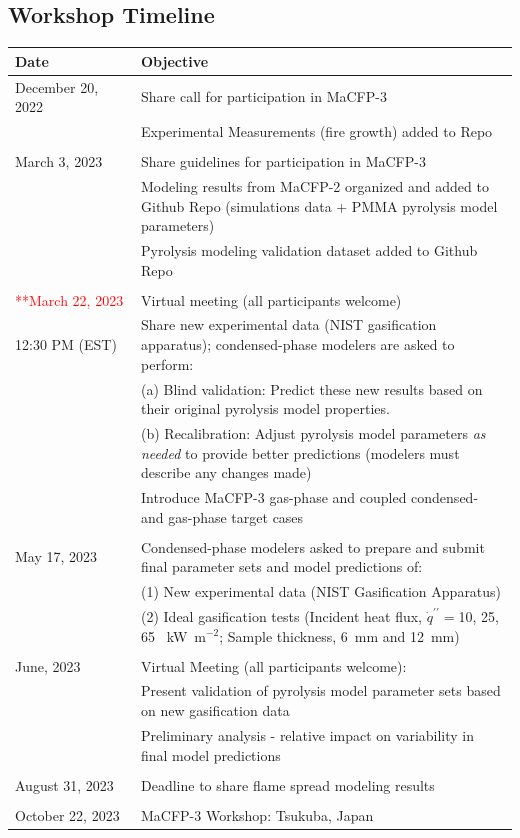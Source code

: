 \documentclass[12pt]{article}
\newcommand{\pp}{\prime\prime}
\begin{document}
\subsection{Workshop Timeline}
\label{Timeline}
\begin{table}[htb]
\begin{tabular}{p{0.25\linewidth} | p{0.75\linewidth}}
\hline
\textbf{Date}       	& \textbf{Objective} \\
\hline
December 20, 2022	& Share call for participation in MaCFP-3\\
& Experimental Measurements (fire growth) added to Repo\\ 
\\
March 3, 2023    	& Share guidelines for participation in MaCFP-3 \\
& Modeling results from MaCFP-2 organized and added to Github Repo (simulations data + PMMA pyrolysis model parameters)\\ 
& Pyrolysis modeling validation dataset added to Github Repo\\ 
\\
\textcolor{red}{**March 22, 2023}  	& Virtual meeting (all participants welcome)\\
12:30 PM (EST) &Share new experimental data (NIST gasification apparatus); condensed-phase modelers are asked to perform:\\ 
&(a) Blind validation: Predict these new results based on their original pyrolysis model properties. \\ 
&(b) Recalibration: Adjust pyrolysis model parameters \textit{as needed} to provide better predictions (modelers must describe any changes made)\\ 
&Introduce MaCFP-3 gas-phase and coupled condensed- and gas-phase target cases\\
\\
May 17, 2023  &Condensed-phase modelers asked to prepare and submit final parameter sets and model predictions of: \\
&{ }(1) New experimental data (NIST Gasification Apparatus)\\    
&{ }(2) Ideal gasification tests (Incident heat flux, $\dot{q}^{\pp}=$10, 25, 65 ~kW~m$^{-2}$; Sample thickness, 6~mm and 12~mm)\\
\\
June, 2023           	& Virtual Meeting  (all participants welcome):\\ 
&Present validation of pyrolysis model parameter sets based on new gasification data \\ 
&Preliminary analysis - relative impact on variability in final model predictions\\
\\
August 31, 2023 	& Deadline to share flame spread modeling results \\ {}\\
October 22, 2023   	& MaCFP-3 Workshop: Tsukuba, Japan \\
\hline
\end{tabular}
\end{table}
\end{document}
